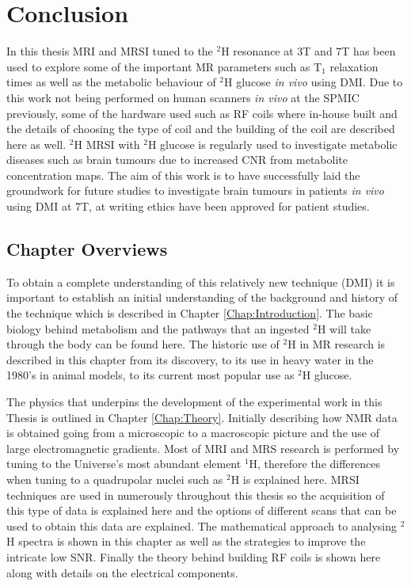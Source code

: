 \chapter{Conclusion}
\label{section:Conclusion}

In this thesis \ac{MRI} and \ac{MRSI} tuned to the $^2$H resonance at 3T and 7T has been used to explore some of the important MR parameters such as T$_1$ relaxation times as well as the metabolic behaviour of $^2$H glucose \textit{in vivo} using \ac{DMI}. Due to this work not being performed on human scanners \textit{in vivo} at the \ac{SPMIC} previously, some of the hardware used such as \ac{RF} coils where in-house built and the details of choosing the type of coil and the building of the coil are described here as well. $^2$H MRSI with $^2$H glucose is regularly used to investigate metabolic diseases such as brain tumours due to increased \ac{CNR} from metabolite concentration maps. The aim of this work is to have successfully laid the groundwork for future studies to investigate brain tumours in patients \textit{in vivo} using \ac{DMI} at 7T, at writing ethics have been approved for patient studies. 

\section{Chapter Overviews}

To obtain a complete understanding of this relatively new technique (\ac{DMI}) it is important to establish an initial understanding of the background and history of the technique which is described in Chapter \ref{Chap:Introduction}. The basic biology behind metabolism and the pathways that an ingested $^2$H will take through the body can be found here. The historic use of $^2$H in MR research is described in this chapter from its discovery, to its use in heavy water in the 1980's in animal models, to its current most popular use as $^2$H glucose.

The physics that underpins the development of the experimental work in this Thesis is outlined in Chapter \ref{Chap:Theory}. Initially describing how \ac{NMR} data is obtained going from a microscopic to a macroscopic picture and the use of large electromagnetic gradients. Most of \ac{MRI} and \ac{MRS} research is performed by tuning to the Universe's most abundant element $^1$H, therefore the differences when tuning to a quadrupolar nuclei such as $^2$H is explained here. \Ac{MRSI} techniques are used in numerously throughout this thesis so the acquisition of this type of data is explained here and the options of different scans that can be used to obtain this data are explained. The mathematical approach to analysing $^2$H spectra is shown in this chapter as well as the strategies to improve the intricate low \ac{SNR}. Finally the theory behind building \ac{RF} coils is shown here along with details on the electrical components.

